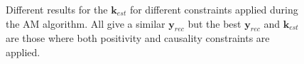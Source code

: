 \documentclass[]{elsarticle} %
\begin{document}
\begin{figure}[H]
    \centering
    \caption{ Different results for the $\textbf{k}_{est}$ for different constraints applied during the AM algorithm. All give a similar $\textbf{y}_{rec}$ but the best  $\textbf{y}_{rec}$ and $\textbf{k}_{est}$ are those where both positivity and causality constraints are applied. }
    \label{fig_full_k}
\end{figure}
\end{document}
